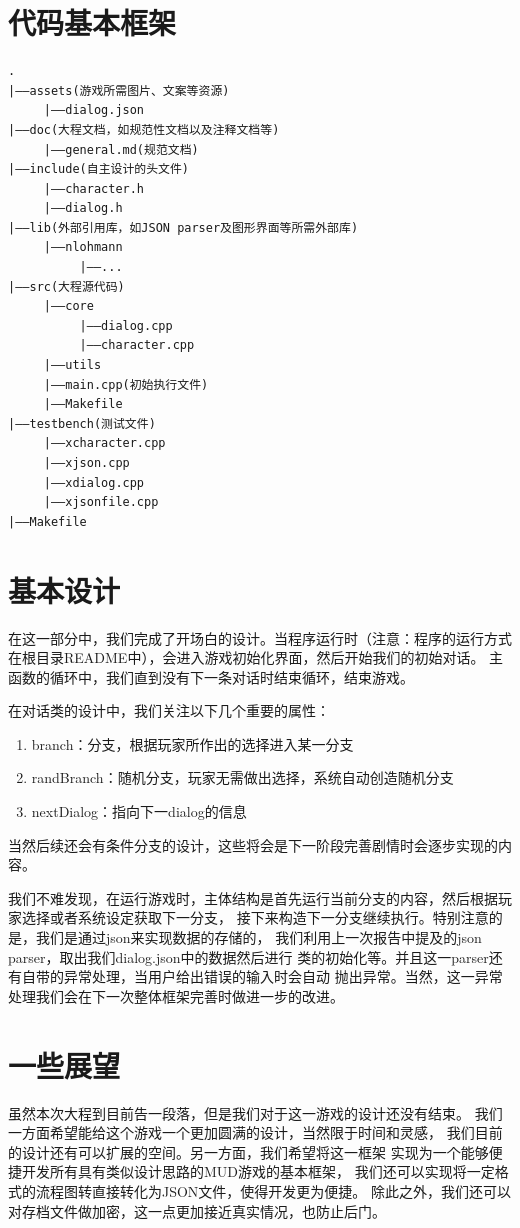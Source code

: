 \documentclass[UTF8]{ctexart}
\begin{document}
    \section{代码基本框架}
\begin{lstlisting}
.
|——assets(游戏所需图片、文案等资源)
     |——dialog.json
|——doc(大程文档，如规范性文档以及注释文档等)
     |——general.md(规范文档)
|——include(自主设计的头文件)
     |——character.h
     |——dialog.h
|——lib(外部引用库，如JSON parser及图形界面等所需外部库)
     |——nlohmann
          |——...
|——src(大程源代码)
     |——core
          |——dialog.cpp
          |——character.cpp
     |——utils
     |——main.cpp(初始执行文件)
     |——Makefile
|——testbench(测试文件)
     |——xcharacter.cpp
     |——xjson.cpp
     |——xdialog.cpp
     |——xjsonfile.cpp
|——Makefile
\end{lstlisting}
    
    \section{基本设计}
    在这一部分中，我们完成了开场白的设计。当程序运行时（注意：程序的运行方式
    在根目录README中），会进入游戏初始化界面，然后开始我们的初始对话。
    主函数的循环中，我们直到没有下一条对话时结束循环，结束游戏。

    在对话类的设计中，我们关注以下几个重要的属性：
    \begin{enumerate}
        \item branch：分支，根据玩家所作出的选择进入某一分支
        \item randBranch：随机分支，玩家无需做出选择，系统自动创造随机分支
        \item nextDialog：指向下一dialog的信息
    \end{enumerate}
    
    当然后续还会有条件分支的设计，这些将会是下一阶段完善剧情时会逐步实现的内容。

    我们不难发现，在运行游戏时，主体结构是首先运行当前分支的内容，然后根据玩家选择或者系统设定获取下一分支，
    接下来构造下一分支继续执行。特别注意的是，我们是通过json来实现数据的存储的，
    我们利用上一次报告中提及的json parser，取出我们dialog.json中的数据然后进行
    类的初始化等。并且这一parser还有自带的异常处理，当用户给出错误的输入时会自动
    抛出异常。当然，这一异常处理我们会在下一次整体框架完善时做进一步的改进。
    
    \section{一些展望}
    虽然本次大程到目前告一段落，但是我们对于这一游戏的设计还没有结束。
    我们一方面希望能给这个游戏一个更加圆满的设计，当然限于时间和灵感，
    我们目前的设计还有可以扩展的空间。另一方面，我们希望将这一框架
    实现为一个能够便捷开发所有具有类似设计思路的MUD游戏的基本框架，
    我们还可以实现将一定格式的流程图转直接转化为JSON文件，使得开发更为便捷。
    除此之外，我们还可以对存档文件做加密，这一点更加接近真实情况，也防止后门。
\end{document}
